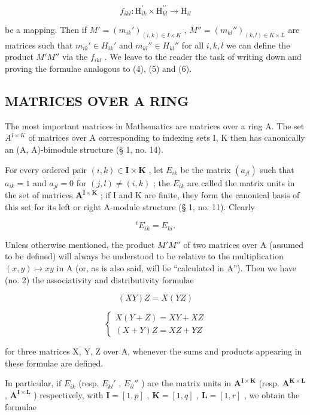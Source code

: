 \[
f _ {i k l}: \mathrm{H} _ {i k} ^ {\prime} \times \mathrm{H} _ {k l} ^ {\prime \prime} \rightarrow \mathrm{H} _ {i l}
\]

be a mapping. Then if \(M' = (m_{ik}')_{(i,k) \in I \times K}\) , \(M'' = (m_{kl}'')_{(k,l) \in K \times L}\) are matrices such that \(m_{ik}' \in H_{ik}'\) and \(m_{kl}'' \in H_{kl}''\) for all \(i, k, l\) we can define the product \(M'M''\) via the \(f_{ikl}\) . We leave to the reader the task of writing down and proving the formulae analogous to (4), (5) and (6).

\subsection{MATRICES OVER A RING}

The most important matrices in Mathematics are matrices over a ring A. The set \(A^{I \times K}\) of matrices over A corresponding to indexing sets I, K then has canonically an (A, A)-bimodule structure (§ 1, no. 14).

For every ordered pair \((i,k)\in\mathbf{I}\times\mathbf{K}\) , let \(E_{ik}\) be the matrix \((a_{jl})\) such that \(a_{ik}=1\) and \(a_{jl}=0\) for \((j,l)\neq(i,k)\) ; the \(E_{ik}\) are called the matrix units in the set of matrices \(\mathbf{A}^{\mathbf{I}\times\mathbf{K}}\) ; if I and K are finite, they form the canonical basis of this set for its left or right A-module structure (§ 1, no. 11). Clearly

\[
{ } ^ { t } E _ { i k } = E _ { k i } .
\]

Unless otherwise mentioned, the product \(M'M''\) of two matrices over A (assumed to be defined) will always be understood to be relative to the multiplication \((x,y)\mapsto xy\) in A (or, as is also said, will be ``calculated in A''). Then we have (no. 2) the associativity and distributivity formulae

\[
(X Y) Z = X (Y Z)\tag{7}
\]

\[
\left\{ \begin{array}{l} X (Y + Z) = X Y + X Z \\ (X + Y) Z = X Z + Y Z \end{array} \right.\tag{8}
\]

for three matrices X, Y, Z over A, whenever the sums and products appearing in these formulae are defined.

In particular, if \(E_{ik}\) (resp. \(E_{kl}'\) , \(E_{il}''\) ) are the matrix units in \(\mathbf{A}^{\mathbf{I} \times \mathbf{K}}\) (resp. \(\mathbf{A}^{\mathbf{K} \times \mathbf{L}}\) , \(\mathbf{A}^{\mathbf{I} \times \mathbf{L}}\) ) respectively, with \(\mathbf{I} = [1, p]\) , \(\mathbf{K} = [1, q]\) , \(\mathbf{L} = [1, r]\) , we obtain the formulae

